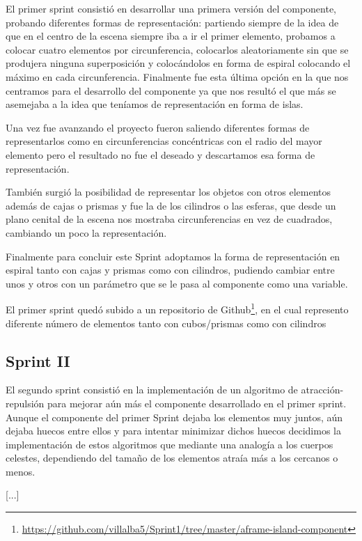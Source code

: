 \documentclass[a4paper, 12pt]{book}
\begin{document}
El primer sprint consistió en desarrollar una primera versión del componente, probando diferentes formas de representación: partiendo siempre de la idea de que en el centro de la escena siempre iba a ir el primer elemento, probamos a colocar cuatro elementos por circunferencia, colocarlos aleatoriamente sin que se produjera ninguna superposición y colocándolos en forma de espiral colocando el máximo en cada circunferencia. Finalmente fue esta última opción en la que nos centramos para el desarrollo del componente ya que nos resultó el que más se asemejaba a la idea que teníamos de representación en forma de islas.

Una vez fue avanzando el proyecto fueron saliendo diferentes formas de representarlos como en circunferencias concéntricas con el radio del mayor elemento pero el resultado no fue el deseado y descartamos esa forma de representación.

También surgió la posibilidad de representar los objetos con otros elementos además de cajas o prismas y fue la de los cilindros o las esferas, que desde un plano cenital de la escena nos mostraba circunferencias en vez de cuadrados, cambiando un poco la representación.

Finalmente para concluir este Sprint adoptamos la forma de representación en espiral tanto con cajas y prismas como con cilindros, pudiendo cambiar entre unos y otros con un parámetro que se le pasa al componente como una variable.

El primer sprint quedó subido a un repositorio de Github\footnote{\url{https://github.com/villalba5/Sprint1/tree/master/aframe-island-component}}, en el cual represento diferente número de elementos tanto con cubos/prismas como con cilindros


\subsection{Sprint II}
\label{subsec:segundo sprint}

El segundo sprint consistió en la implementación de un algoritmo de atracción-repulsión para mejorar aún más el componente desarrollado en el primer sprint. Aunque el componente del primer Sprint dejaba los elementos muy juntos, aún dejaba huecos entre ellos y para intentar minimizar dichos huecos decidimos la implementación de estos algoritmos que mediante una analogía a los cuerpos celestes, dependiendo del tamaño de los elementos atraía más a los cercanos o menos.

[...]
\end{document}
